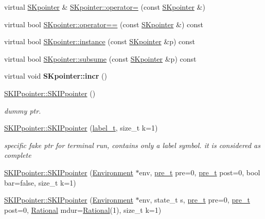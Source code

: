 \begin{DoxyCompactItemize}
virtual \mbox{\hyperlink{classSKpointer}{S\+Kpointer}} \& \mbox{\hyperlink{group__table_gaa75ae4ae4ce8c389471867fa64f503c1}{S\+Kpointer\+::operator=}} (const \mbox{\hyperlink{classSKpointer}{S\+Kpointer}} \&)
\item 
virtual bool \mbox{\hyperlink{group__table_gab77c2fa945fcc938568ace9986c25324}{S\+Kpointer\+::operator==}} (const \mbox{\hyperlink{classSKpointer}{S\+Kpointer}} \&) const
\item 
virtual bool \mbox{\hyperlink{group__table_ga95bdb4d9654b477a82f61d4e8b1d6937}{S\+Kpointer\+::instance}} (const \mbox{\hyperlink{classSKpointer}{S\+Kpointer}} \&p) const
\item 
virtual bool \mbox{\hyperlink{group__table_ga38150ffb7a8bf25ebf5133907d568738}{S\+Kpointer\+::subsume}} (const \mbox{\hyperlink{classSKpointer}{S\+Kpointer}} \&p) const
\item 
\mbox{\label{group__table_ga560a9c964dcc9ad7631213d6ad061a2a}} 
virtual void {\bfseries S\+Kpointer\+::incr} ()
\item 
\mbox{\hyperlink{group__table_ga24e762a60a81030599decff93dc1a1ef}{S\+K\+I\+Ppointer\+::\+S\+K\+I\+Ppointer}} ()
\begin{DoxyCompactList}\small\item\em dummy ptr. \end{DoxyCompactList}\item 
\mbox{\hyperlink{group__table_ga1fc4cd4038153502277d11c5607a14fa}{S\+K\+I\+Ppointer\+::\+S\+K\+I\+Ppointer}} (\mbox{\hyperlink{group__output_ga22fde970e635fcf63962743b2d5c441d}{label\+\_\+t}}, size\+\_\+t k=1)
\begin{DoxyCompactList}\small\item\em specific fake ptr for terminal run, contains only a label symbol. it is considered as complete \end{DoxyCompactList}\item 
\mbox{\hyperlink{group__table_gab217454122f2ec0af5c16bb1ae996925}{S\+K\+I\+Ppointer\+::\+S\+K\+I\+Ppointer}} (\mbox{\hyperlink{classEnvironment}{Environment}} $\ast$env, \mbox{\hyperlink{group__general_ga092fe8b972dfa977c2a0886720a7731e}{pre\+\_\+t}} pre=0, \mbox{\hyperlink{group__general_ga092fe8b972dfa977c2a0886720a7731e}{pre\+\_\+t}} post=0, bool bar=false, size\+\_\+t k=1)
\item 
\mbox{\hyperlink{group__table_ga8a29b4e0af8d4fc8d298b7027e4cf638}{S\+K\+I\+Ppointer\+::\+S\+K\+I\+Ppointer}} (\mbox{\hyperlink{classEnvironment}{Environment}} $\ast$env, state\+\_\+t s, \mbox{\hyperlink{group__general_ga092fe8b972dfa977c2a0886720a7731e}{pre\+\_\+t}} pre=0, \mbox{\hyperlink{group__general_ga092fe8b972dfa977c2a0886720a7731e}{pre\+\_\+t}} post=0, \mbox{\hyperlink{classRational}{Rational}} mdur=\mbox{\hyperlink{classRational}{Rational}}(1), size\+\_\+t k=1)

\end{DoxyCompactItemize}
